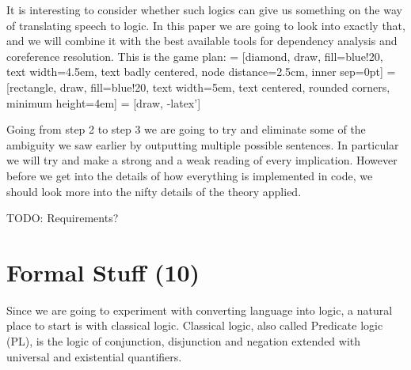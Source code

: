 \documentclass[12pt]{article}
\let\stdsection\section
\renewcommand\section{\newpage\stdsection}
\begin{document}
It is interesting to consider whether such logics can give us something on the way of translating speech to logic. In this paper we are going to look into exactly that, and we will combine it with the best available tools for dependency analysis and coreference resolution. This is the game plan:
\vspace{1em}
 = [diamond, draw, fill=blue!20,
    text width=4.5em, text badly centered, node distance=2.5cm, inner sep=0pt]
 = [rectangle, draw, fill=blue!20,
    text width=5em, text centered, rounded corners, minimum height=4em]
 = [draw, -latex']

Going from step 2 to step 3 we are going to try and eliminate some of the ambiguity we saw earlier by outputting multiple possible sentences. In particular we will try and make a strong and a weak reading of every implication. However before we get into the details of how everything is implemented in code, we should look more into the nifty details of the theory applied.

TODO: Requirements?

\section{Formal Stuff (10)}


Since we are going to experiment with converting language into logic, a natural place to start is with classical logic. Classical logic, also called Predicate logic (PL), is the logic of conjunction, disjunction and negation extended with universal and existential quantifiers.
\end{document}
